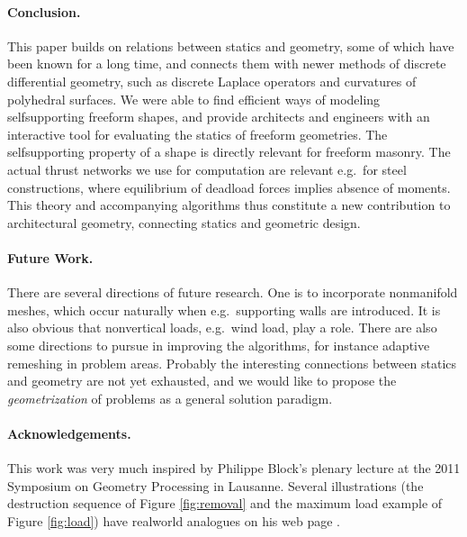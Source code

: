\documentclass[review]{acmsiggraph}
\begin{document}
\paragraph{Conclusion.}

This paper builds on relations between statics and geometry, some of which
have been known for a long time, and connects them with newer methods of
discrete differential geometry, such as discrete Laplace operators and
curvatures of polyhedral surfaces. We were able to find efficient ways of
modeling self\dash supporting freeform shapes, and provide architects and
engineers with an interactive tool for evaluating the
statics of freeform geometries. The self\dash supporting property of a
shape is directly relevant for freeform masonry. The actual thrust
networks we use for computation are relevant e.g.\ for steel
constructions, where equilibrium of deadload forces implies absence of
moments. This theory and accompanying algorithms thus constitute a new
contribution to architectural geometry, connecting statics and geometric
design.

\paragraph{Future Work.}

There are several directions of future research. One is to incorporate
non\dash manifold meshes, which occur naturally when e.g.\ supporting
walls are introduced. It is also obvious that non\dash vertical loads,
e.g.\ wind load, play a role. There are also some directions to pursue in
improving the algorithms, for instance adaptive remeshing in problem
areas. Probably the interesting connections between statics and
geometry are not yet exhausted, and we would like to propose the {\em
geometrization} of problems as a general solution paradigm.

\paragraph*{Acknowledgements.}

This work was very much inspired by Philippe Block's plenary lecture
at the 2011 Symposium on Geometry Processing in Lausanne. Several
illustrations (the destruction sequence of Figure \ref{fig:removal}
and the maximum load example of Figure
\ref{fig:load}) have real\dash world analogues on his web page \cite{catalan}.
\end{document}
